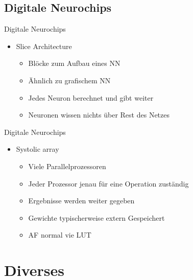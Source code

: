 \documentclass[handout]{beamer}
\begin{document}
    \subsection{Digitale Neurochips}
    \begin{frame} {Digitale Neurochips}
        \begin{itemize}
            \item Slice Architecture
            \begin{itemize}
                \item Blöcke zum Aufbau eines NN
                \item Ähnlich zu grafischem NN
                \item Jedes Neuron berechnet und gibt weiter
                \item Neuronen wissen nichts über Rest des Netzes
            \end{itemize}
        \end{itemize}
    \end{frame}

    \begin{frame} {Digitale Neurochips}
        \begin{itemize}
            \item Systolic array
            \begin{itemize}
                \item Viele Parallelprozessoren
                \item Jeder Prozessor jenau für eine Operation zuständig
                \item Ergebnisse werden weiter gegeben
                \item Gewichte typischerweise extern Gespeichert
                \item AF normal vie LUT
            \end{itemize}
        \end{itemize}
    \end{frame}





    \section{Diverses}
\end{document}
